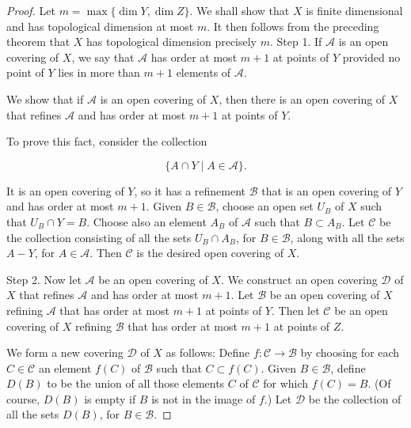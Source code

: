 \begin{proof}
Let \(m = \max \{ \dim Y,\dim Z\}\). We shall show that \(X\) is finite dimensional and has topological dimension at most \(m\). It then follows from the preceding theorem that \(X\) has topological dimension precisely \(m\).
Step 1. If \(\mathcal{A}\) is an open covering of \(X\), we say that \(\mathcal{A}\) has order at most \(m + 1\) at points of \(Y\) provided no point of \(Y\) lies in more than \(m + 1\) elements of \(\mathcal{A}\).

We show that if \(\mathcal{A}\) is an open covering of \(X\), then there is an open covering of \(X\) that refines \(\mathcal{A}\) and has order at most \(m + 1\) at points of \(Y\).

To prove this fact, consider the collection

\[
\{ A \cap Y \mid A \in \mathcal{A}\}.
\]

It is an open covering of \(Y\), so it has a refinement \(\mathcal{B}\) that is an open covering of \(Y\) and has order at most \(m + 1\). Given \(B \in \mathcal{B}\), choose an open set \(U_{B}\) of \(X\) such that \(U_{B} \cap Y = B\). Choose also an element \(A_{B}\) of \(\mathcal{A}\) such that \(B \subset {A}_{B}\). Let \(\mathcal{C}\) be the collection consisting of all the sets \(U_{B} \cap {A}_{B}\), for \(B \in \mathcal{B}\), along with all the sets \(A - Y\), for \(A \in \mathcal{A}\). Then \(\mathcal{C}\) is the desired open covering of \(X\).

Step 2. Now let \(\mathcal{A}\) be an open covering of \(X\). We construct an open covering \(\mathcal{D}\) of \(X\) that refines \(\mathcal{A}\) and has order at most \(m + 1\). Let \(\mathcal{B}\) be an open covering of \(X\) refining \(\mathcal{A}\) that has order at most \(m + 1\) at points of \(Y\). Then let \(\mathcal{C}\) be an open covering of \(X\) refining \(\mathcal{B}\) that has order at most \(m + 1\) at points of \(Z\).

We form a new covering \(\mathcal{D}\) of \(X\) as follows: Define \(f : \mathcal{C} \rightarrow \mathcal{B}\) by choosing for each \(C \in \mathcal{C}\) an element \(f( C)\) of \(\mathcal{B}\) such that \(C \subset f( C)\). Given \(B \in \mathcal{B}\), define \(D( B)\) to be the union of all those elements \(C\) of \(\mathcal{C}\) for which \(f( C) = B\). (Of course, \(D( B)\) is empty if \(B\) is not in the image of \(f\).) Let \(\mathcal{D}\) be the collection of all the sets \(D( B)\), for \(B \in \mathcal{B}\).


\end{proof}

